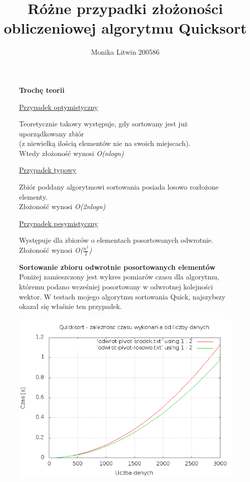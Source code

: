 \documentclass[a4paper,11pt]{report}
\title{Różne przypadki złożoności obliczeniowej algorytmu Quicksort}
\author{Monika Litwin 200586}
\begin{document}
\maketitle

\begin{figure}
  \begin{center}
  \textbf{Trochę teorii}
\\
\begin{flushleft}\underline{Przypadek optymistyczny}\end{flushleft}
Teoretycznie takowy występuje, gdy sortowany jest już uporządkowany zbiór \\(z niewielką ilością elementów nie na swoich miejscach). \\Wtedy złożoność wynosi \emph{O(nlogn)}

\begin{flushleft}\underline{Przypadek typowy}\end{flushleft}
Zbiór poddany algorytmowi sortowania posiada losowo rozłożone elementy.\\ Złożoność wynosi \emph{O(2nlogn)}

\begin{flushleft}\underline{Przypadek pesymistyczny}\end{flushleft}
Występuje dla zbiorów o elementach posortowanych odwrotnie.\\ Złożoność wynosi \emph{O($\frac {n^{2}}{2}$)}

    \label{fig:}
  \end{center}
\end{figure}

\begin{figure}
  \begin{center}
	\textbf{Sortowanie zbioru odwrotnie posortowanych elementów}
\\ Poniżej zamieszczony jest wykres pomiarów czasu dla algorytmu, któremu podano wcześniej posortowany w odwrotnej kolejności wektor. 
W testach mojego algorytmu sortowania Quick, najszybszy okazał się właśnie ten przypadek.

    \includegraphics[scale=0.5]{./odwrotnie.png}
    \label{fig:}
  \end{center}
\end{figure}
\end{document}
